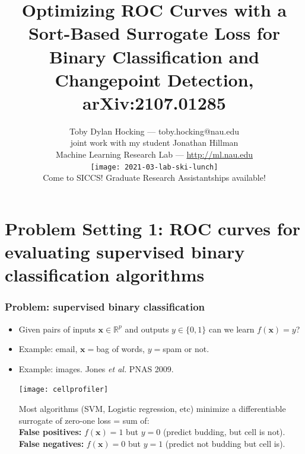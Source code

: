 \documentclass[t]{beamer}
\begin{document}
\title{Optimizing ROC Curves with a Sort-Based Surrogate Loss for Binary Classification and Changepoint Detection, arXiv:2107.01285}

\author{
  Toby Dylan Hocking --- toby.hocking@nau.edu\\ 
  joint work with my student Jonathan Hillman\\
  Machine Learning Research Lab --- \url{http://ml.nau.edu}\\
  \texttt{[image: 2021-03-lab-ski-lunch]} \\
  Come to SICCS! Graduate Research Assistantships available!
}

\date{}

\maketitle

\section{Problem Setting 1: ROC curves for evaluating supervised  binary classification algorithms}

\begin{frame}
  \frametitle{Problem: supervised binary classification}
  
  \begin{itemize}
  \item Given pairs of inputs $\mathbf x\in\mathbb R^p$ and outputs
    $y\in\{0,1\}$ can we learn $f(\mathbf x)= y$?
  \item Example: email, $\mathbf x =$bag of words, $y=$spam or not.
  \item Example: images. Jones {\it et al.} PNAS 2009.
    \parbox{2in}{\texttt{[image: cellprofiler]}}
    \parbox{1.9in}{Most algorithms (SVM, Logistic regression, etc) minimize a differentiable surrogate of zero-one loss = sum of:\\
      \textbf{False positives:} $f(\mathbf x)=1$ but $y=0$ (predict
      budding, but cell is not).\\
      \textbf{False negatives:} $f(\mathbf x)=0$ but $y=1$ (predict
      not budding but cell is).  }
  \end{itemize} 
\end{frame}
\end{document}
